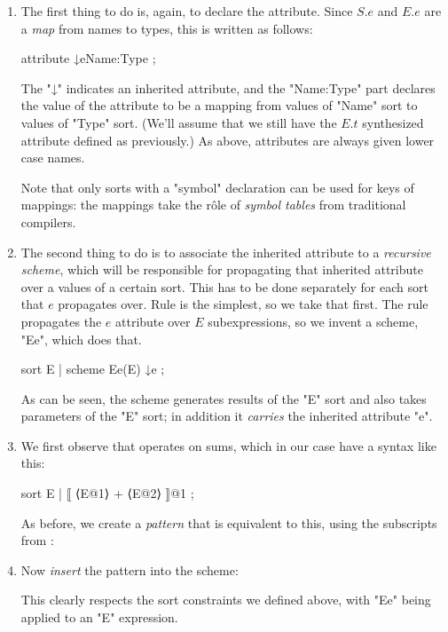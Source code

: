 \documentclass[11pt]{article} %
\begin{document}
\begin{enumerate}

\item The first thing to do is, again, to declare the attribute.  Since $S.e$ and $E.e$ are a
  \emph{map} from names to types, this is written as follows:
\begin{hacs}
   attribute ↓e{Name:Type} ;
\end{hacs}
  The "↓" indicates an inherited attribute, and the "{Name:Type}" part declares the value of the
  attribute to be a mapping from values of "Name" sort to values of "Type" sort. (We'll assume that
  we still have the $E.t$ synthesized attribute defined as previously.)  As above, attributes are
  always given lower case names.

  Note that only sorts with a "symbol" declaration can be used for keys of mappings: the mappings
  take the rôle of \emph{symbol tables} from traditional compilers.

\item The second thing to do is to associate the inherited attribute to a \emph{recursive scheme},
  which will be responsible for propagating that inherited attribute over a values of a certain
  sort.  This has to be done separately for each sort that $e$ propagates over.  Rule  is
  the simplest, so we take that first.  The rule propagates the $e$ attribute over $E$
  subexpressions, so we invent a scheme, "Ee", which does that.
\begin{hacs}
   sort E | scheme Ee(E) ↓e ;
\end{hacs}
  As can be seen, the scheme generates results of the "E" sort and also takes parameters of the "E"
  sort; in addition it \emph{carries} the inherited attribute "e".

\item We first observe that  operates on sums, which in our case have a syntax like this:
\begin{hacs}
   sort E | ⟦ ⟨E@1⟩ + ⟨E@2⟩ ⟧@1 ;
\end{hacs}
  As before, we create a \emph{pattern} that is equivalent to this, using the subscripts from :

\item Now \emph{insert} the pattern into the scheme:
  This clearly respects the sort constraints we defined above, with "Ee" being applied to an "E" expression.


\end{enumerate}
\end{document}

